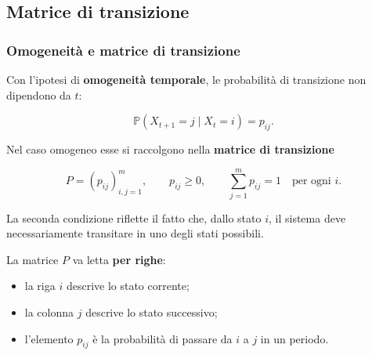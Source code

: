 \documentclass[handout]{beamer}%
\newenvironment{stepitemize}{\begin{itemize}[<+->]}{\end{itemize} }
\providecommand{\Prob}{\mathbb{P}}
\providecommand{\QTR}[2]{\csname #1\endcsname{#2}}
\begin{document}


\subsection{Matrice di transizione}%

\begin{frame}%
%

\frametitle{Omogeneit\`{a} e matrice di transizione}%
%

%


Con l'ipotesi di \textbf{omogeneit\`{a} temporale}, le probabilit\`{a} di
transizione non dipendono da $t$:%

\[
\Prob(X_{t+1}=j \mid X_{t}=i)=p_{ij}.
\]


\medskip

Nel caso omogeneo esse si raccolgono nella \textbf{matrice di transizione}%

\[
P=(p_{ij})_{i,j=1}^{m}, \qquad p_{ij}\geq0, \qquad\sum_{j=1}^{m} p_{ij}=1
\quad\text{per ogni } i.
\]


La seconda condizione riflette il fatto che, dallo stato $i$, il sistema deve
necessariamente transitare in uno degli stati possibili.

\medskip

La matrice $P$ va letta \textbf{per righe}:

\begin{stepitemize}
\item la riga $i$ descrive lo stato corrente;

\item la colonna $j$ descrive lo stato successivo;

\item l'elemento $p_{ij}$ \`{e} la probabilit\`{a} di passare da $i$ a $j$ in
un periodo.
\end{stepitemize}%

\transboxout
\end{frame}%
\end{document}
